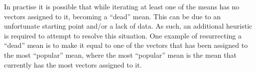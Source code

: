 In practise it is possible that while iterating at least one of the means has no vectors assigned to it,
becoming a ``dead'' mean.
This can be due to an unfortunate starting point and/or a lack of data.
As such, an additional heuristic is required to attempt to resolve this situation.
One example of resurrecting a ``dead'' mean is to make it equal to one of the vectors
that has been assigned to the most ``popular'' mean,
where the most ``popular'' mean is the mean that currently has the most vectors assigned to it.

